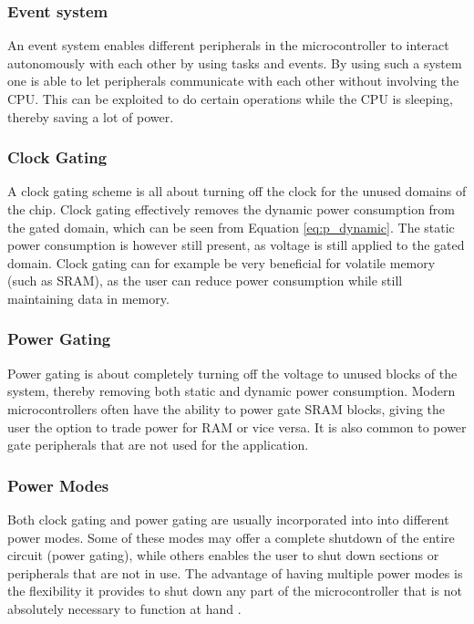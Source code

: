 \subsubsection{Event system}

An event system enables different peripherals in the microcontroller to interact autonomously with each other by using tasks and events. By using such a system one is able to let peripherals communicate with each other without involving the CPU. This can be exploited to do certain operations while the CPU is sleeping, thereby saving a lot of power.

\subsubsection{Clock Gating}

A clock gating scheme is all about turning off the clock for the unused domains of the chip. Clock gating effectively removes the dynamic power consumption from the gated domain, which can be seen from Equation \ref{eq:p_dynamic}. The static power consumption is however still present, as voltage is still applied to the gated domain. Clock gating can for example be very beneficial for volatile memory (such as SRAM), as the user can reduce power consumption while still maintaining data in memory.

\subsubsection{Power Gating}

Power gating is about completely turning off the voltage to unused blocks of the system, thereby removing both static and dynamic power consumption. Modern microcontrollers often have the ability to power gate SRAM blocks, giving the user the option to trade power for RAM or vice versa. It is also common to power gate peripherals that are not used for the application.

\subsubsection{Power Modes}

Both clock gating and power gating are usually incorporated into into different power modes. Some of these modes may offer a complete shutdown of the entire circuit (power gating), while others enables the user to shut down sections or peripherals that are not in use. The advantage of having multiple power modes is the flexibility it provides to shut down any part of the microcontroller that is not absolutely necessary to function at hand \cite[~p.4]{holberg06}.  

